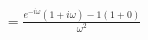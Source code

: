 \documentclass[preview]{standalone}
\begin{document}
\begin{align*}
&=\frac{e^{-i\omega}(1+i\omega)-1(1+0)}{\omega^{2}} \\
\end{align*}
\end{document}
